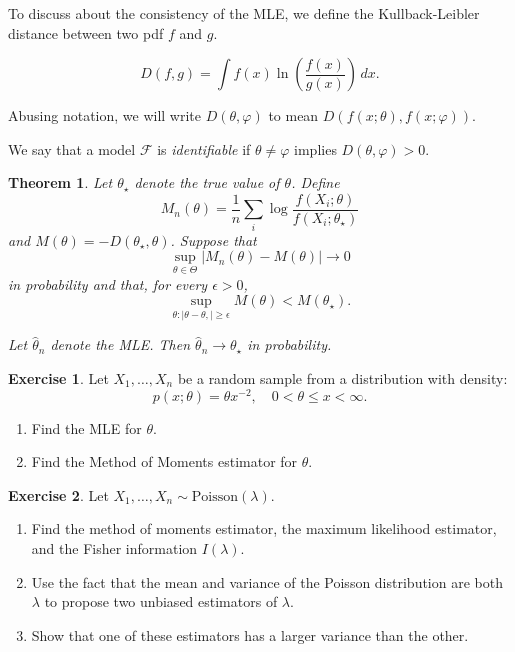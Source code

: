 \documentclass[
  openany]{book}
\newtheorem{theorem}{Theorem}[chapter]
\theoremstyle{definition}
\theoremstyle{definition}
\theoremstyle{definition}
\newtheorem{exercise}{Exercise}[chapter]
\theoremstyle{definition}
\theoremstyle{remark}
\begin{document}
To discuss about the consistency of the MLE, we define the
Kullback-Leibler distance between two pdf \(f\) and \(g\).

\[ D(f,g) = \int f(x) \ln \left( \frac{f(x)}{g(x)} \right) \, dx.\]

Abusing notation, we will write
\(D(\theta, \varphi)\) to mean \(D(f(x;\theta), f(x;\varphi))\).

We say that a model \(\mathcal{F}\) is \emph{identifiable} if \(\theta \not= \varphi\) implies
\(D(\theta, \varphi) > 0\).

\begin{theorem}
Let \(\theta_{\star}\) denote the true value of \(\theta\). Define
\[
M_n(\theta)=\frac{1}{n} \sum_i \log \frac{f\left(X_i ; \theta\right)}{f\left(X_i ; \theta_{\star}\right)}
\]
and \(M(\theta)=-D\left(\theta_{\star}, \theta\right)\). Suppose that
\[
\sup _{\theta \in \Theta}\left|M_n(\theta)-M(\theta)\right| \to 0
\]
in probability
and that, for every \(\epsilon>0\),
\[
\sup _{\theta:|\theta-\theta,| \geq \epsilon} M(\theta)<M\left(\theta_{\star}\right) .
\]

Let \(\widehat{\theta}_n\) denote the MLE. Then \(\widehat{\theta}_n \to \theta_{\star}\) in probability.
\end{theorem}

\begin{exercise}

Let \(X_1, \ldots, X_n\) be a random sample from a distribution with density:
\[ p(x; \theta) = \theta x^{-2}, \quad 0 < \theta \leq x < \infty. \]

\begin{enumerate}
\def\labelenumi{\arabic{enumi}.}
\item
  Find the MLE for \(\theta\).
\item
  Find the Method of Moments estimator for \(\theta\).
\end{enumerate}

\end{exercise}

\begin{exercise}

Let \(X_1, \ldots, X_n \sim \text{Poisson}(\lambda)\).

\begin{enumerate}
\def\labelenumi{\arabic{enumi}.}
\item
  Find the method of moments estimator, the maximum likelihood estimator, and the Fisher information \(I(\lambda)\).
\item
  Use the fact that the mean and variance of the Poisson distribution are both \(\lambda\) to propose two unbiased estimators of \(\lambda\).
\item
  Show that one of these estimators has a larger variance than the other.
\end{enumerate}

\end{exercise}
\end{document}

